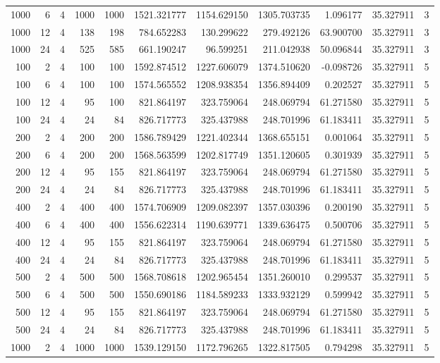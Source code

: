 \begin{table}
\begin{tabular}{rrrrrrrrrrr}
1000 & 6 & 4 & 1000 & 1000 & 1521.321777 & 1154.629150 & 1305.703735 & 1.096177 & 35.327911 & 3 \\
1000 & 12 & 4 & 138 & 198 & 784.652283 & 130.299622 & 279.492126 & 63.900700 & 35.327911 & 3 \\
1000 & 24 & 4 & 525 & 585 & 661.190247 & 96.599251 & 211.042938 & 50.096844 & 35.327911 & 3 \\
100 & 2 & 4 & 100 & 100 & 1592.874512 & 1227.606079 & 1374.510620 & -0.098726 & 35.327911 & 5 \\
100 & 6 & 4 & 100 & 100 & 1574.565552 & 1208.938354 & 1356.894409 & 0.202527 & 35.327911 & 5 \\
100 & 12 & 4 & 95 & 100 & 821.864197 & 323.759064 & 248.069794 & 61.271580 & 35.327911 & 5 \\
100 & 24 & 4 & 24 & 84 & 826.717773 & 325.437988 & 248.701996 & 61.183411 & 35.327911 & 5 \\
200 & 2 & 4 & 200 & 200 & 1586.789429 & 1221.402344 & 1368.655151 & 0.001064 & 35.327911 & 5 \\
200 & 6 & 4 & 200 & 200 & 1568.563599 & 1202.817749 & 1351.120605 & 0.301939 & 35.327911 & 5 \\
200 & 12 & 4 & 95 & 155 & 821.864197 & 323.759064 & 248.069794 & 61.271580 & 35.327911 & 5 \\
200 & 24 & 4 & 24 & 84 & 826.717773 & 325.437988 & 248.701996 & 61.183411 & 35.327911 & 5 \\
400 & 2 & 4 & 400 & 400 & 1574.706909 & 1209.082397 & 1357.030396 & 0.200190 & 35.327911 & 5 \\
400 & 6 & 4 & 400 & 400 & 1556.622314 & 1190.639771 & 1339.636475 & 0.500706 & 35.327911 & 5 \\
400 & 12 & 4 & 95 & 155 & 821.864197 & 323.759064 & 248.069794 & 61.271580 & 35.327911 & 5 \\
400 & 24 & 4 & 24 & 84 & 826.717773 & 325.437988 & 248.701996 & 61.183411 & 35.327911 & 5 \\
500 & 2 & 4 & 500 & 500 & 1568.708618 & 1202.965454 & 1351.260010 & 0.299537 & 35.327911 & 5 \\
500 & 6 & 4 & 500 & 500 & 1550.690186 & 1184.589233 & 1333.932129 & 0.599942 & 35.327911 & 5 \\
500 & 12 & 4 & 95 & 155 & 821.864197 & 323.759064 & 248.069794 & 61.271580 & 35.327911 & 5 \\
500 & 24 & 4 & 24 & 84 & 826.717773 & 325.437988 & 248.701996 & 61.183411 & 35.327911 & 5 \\
1000 & 2 & 4 & 1000 & 1000 & 1539.129150 & 1172.796265 & 1322.817505 & 0.794298 & 35.327911 & 5 \\

\end{tabular}
\end{table}
